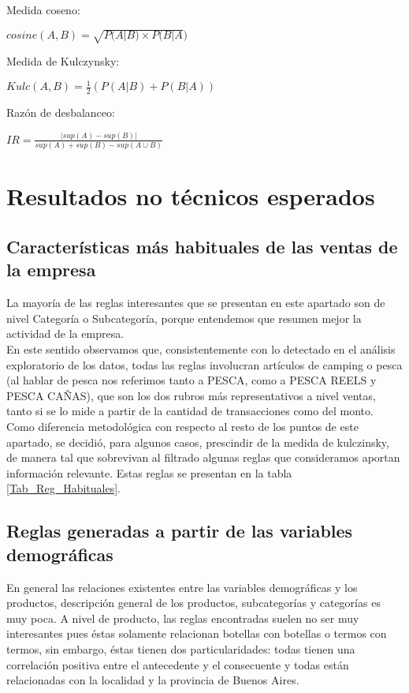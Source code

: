 \documentclass[]{article}
\begin{document}
	Medida coseno:
	
	\begin{center}
		$cosine(A,B) = \sqrt{P(A|B) \times P(B|A})$
	\end{center}
	
	Medida de Kulczynsky:
	
	\begin{center}
		$Kulc(A,B)= \frac{1}{2}\left(P(A|B) + P(B|A)\right)$	
	\end{center}
	
	Razón de desbalanceo:
	
	\begin{center}
		$IR = \frac{|sup(A)- sup(B)|}{sup(A)+ sup(B)-sup(A \cup B)}$	
	\end{center}
	
	\section{Resultados no técnicos esperados}
	
	
	\subsection{Características más habituales de las ventas de la empresa}
	
	La mayoría de las reglas interesantes que se presentan en este apartado son de nivel Categoría o Subcategoría, porque entendemos que resumen mejor la actividad de la empresa.\\
	
	En este sentido observamos que, consistentemente con lo detectado en el análisis exploratorio de los datos, todas las reglas involucran artículos de camping o pesca (al hablar de pesca nos referimos tanto a PESCA, como a PESCA REELS y PESCA CAÑAS), que son los dos rubros más representativos a nivel ventas, tanto si se lo mide a partir de la cantidad de transacciones como del monto.\\ 
	
	Como diferencia metodológica con respecto al resto de los puntos de este apartado, se decidió, para algunos casos, prescindir de la medida de kulczinsky, de manera tal que sobrevivan al filtrado algunas reglas que consideramos aportan información relevante. Estas reglas se presentan en la tabla \ref{Tab_Reg_Habituales}.
	
	\subsection{Reglas generadas a partir de las variables demográficas}
	En general las relaciones existentes entre las variables demográficas y los productos, descripción general de los productos, subcategorías y categorías es muy poca. A nivel de producto, las reglas encontradas suelen no ser muy interesantes pues éstas solamente relacionan botellas con botellas o termos con termos, sin embargo, éstas tienen dos particularidades: todas tienen una correlación positiva entre el antecedente y el consecuente y todas están relacionadas con la localidad y la provincia de Buenos Aires.\\
	
\end{document}

